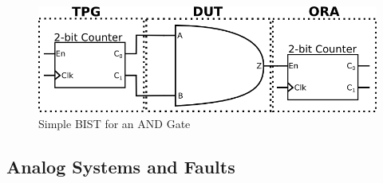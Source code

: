 \documentclass[12pt]{report}
\begin{document}
\begin{figure}
	\begin{center}
		\includegraphics[scale=1]{images/and-bist}
	\end{center}
	\caption{Simple BIST for an AND Gate}
	\label{fig:andbist}
\end{figure}

\subsection{Analog Systems and Faults}
\label{sct:AnalogFaults}
\end{document}

